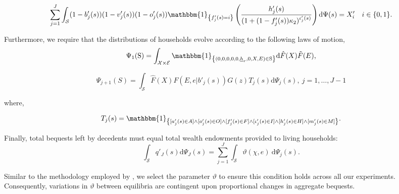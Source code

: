 \documentclass[parskip=full]{article}
\newcommand{\indicator}[1]{\mathbbm{1}_{\left\{ {#1} \right\} }}
\begin{document}
\begin{equation}\label{eq:rental_housing_clearing_condition}
  \sum_{j=1}^J \int_\mathcal{S} (1-b'_{j}(s))(1-v'_{j}(s)) (1-o'_{j}(s))\indicator{f'_{j}(s)=i}\left(\frac{h'_{j}(s)}{(1+(1-f'_{j}(s))\kappa_{2})^{\iota'_{j}(s)}}\right) \mathrm{d}\Psi(s) = X'_{i} \quad i \in \{0,1\}.
\end{equation}

Furthermore, we require that the distributions of households evolve according to the following laws of motion,
\begin{equation}\label{eq:lom1}
\Psi_{1}(\mathrm{S})=\int_{\mathcal{X} \times \mathcal{E}} \indicator{(0,0,0,0,0,\underline{h}_{r},0,X,E)\in \mathrm{S}}\mathrm{d} \hat{F}(X)\tilde{F}(E),
\end{equation}


\begin{equation}\label{eq:lom2}
\Psi_{j+1}(S)=\int_{\mathcal{S}} \hat{F}(X)F(E,e|b'_{j}(s))G(z)T_{j}(s)\mathrm{d}\Psi_{j}(s),\ j=1,\ldots,J-1
\end{equation}

\noindent where,

\begin{align}
    T_{j}(s) = \indicator{[a'_{j}(s)\in A] \land [o'_{j}(s)\in O] \land [f'_{j}(s)\in F] \land [\iota'_{j}(s)\in I] \land [h'_{j}(s) \in H] \land [m'_{j}(s) \in M]}.\notag
\end{align}

Finally, total bequests left by decedents must equal total wealth endowments provided to living households:
\begin{equation}\label{market_clearing:agg_bequests}
      \int_{\mathcal{S}} q'_{J}(s) \mathrm{d}\Psi_{J}(s) =  \sum_{j=1}^J \int_{\mathcal{S}} \vartheta (\chi,e)\ \mathrm{d}\Psi_j(s).
\end{equation}

\noindent Similar to the methodology employed by \citet{kkk-2021}, we select the parameter $\vartheta$ to ensure this condition holds across all our experiments. Consequently, variations in $\vartheta$ between equilibria are contingent upon proportional changes in aggregate bequests.
\end{document}
